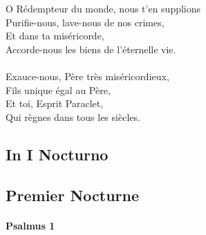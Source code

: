 \documentclass[twoside]{article}
\begin{document}
\begin{paracol}[1]{2}
\newpage
\vspace*{3cm}
O Rédempteur du monde, nous t'en supplions\\
Purifie-nous, lave-nous de nos crimes,\\
Et dans ta miséricorde,\\
Accorde-nous les biens de l'éternelle vie.\\
\\
Exauce-nous, Père très miséricordieux,\\
Fils unique égal au Père,\\
Et toi, Esprit Paraclet,\\
Qui règnes dans tous les siècles.

\newpage

\switchcolumn*

\subsection{In I Nocturno}

\switchcolumn

\subsection{Premier Nocturne}

\switchcolumn*

\paragraph{Psalmus 1}



\end{paracol}
\end{document}
